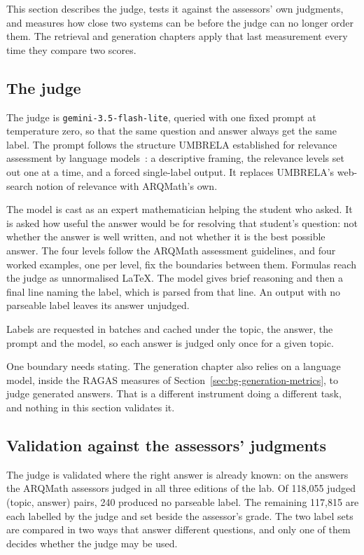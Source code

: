 This section describes the judge, tests it against the assessors' own judgments, and
measures how close two systems can be before the judge can no longer order them.
The retrieval and generation chapters apply that last measurement every
time they compare two scores.

\subsection*{The judge}

The judge is \texttt{gemini-3.5-flash-lite}, queried with one fixed prompt at
temperature zero, so that the same question and answer always get the same label.
The prompt follows the structure UMBRELA established for relevance
assessment by language models~\cite{upadhyay2025umbrela}: a descriptive framing, the
relevance levels set out one at a time, and a forced single-label output. It replaces
UMBRELA's web-search notion of relevance with ARQMath's own.

The model is cast as an expert mathematician helping the student who asked. It is
asked how useful the answer would be for resolving that student's question: not
whether the answer is well written, and not whether it is the best possible answer.
The four levels follow the ARQMath assessment guidelines, and four worked examples,
one per level, fix the boundaries between them. Formulas reach the judge as
unnormalised \LaTeX{}. The model gives brief reasoning and then a final line naming
the label, which is parsed from that line. An output with no parseable label leaves
its answer unjudged.

Labels are requested in batches and cached under the topic, the answer, the prompt
and the model, so each answer is judged only once for a given topic.

One boundary needs stating. The generation chapter also relies on a language
model, inside the RAGAS measures of Section~\ref{sec:bg-generation-metrics}, to judge
generated answers. That is a different instrument doing a different task, and nothing
in this section validates it.

\subsection*{Validation against the assessors' judgments}

The judge is validated where the right answer is already known: on the answers the
ARQMath assessors judged in all three editions of the lab. Of 118{,}055 judged
(topic, answer) pairs, 240 produced no parseable label. The remaining 117{,}815 are
each labelled by the judge and set beside the assessor's grade. The two label sets
are compared in two ways that answer different questions, and only one of them
decides whether the judge may be used.

